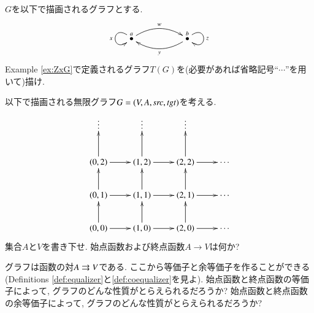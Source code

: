\begin{exercise}\label{exc:secret turing}
$G$を以下で描画されるグラフとする.
$$
\xymatrix{\LMO{a}\ar@/^1pc/[rr]^w\ar@(lu,ld)[]_x&&\LMO{b}\ar@/^1pc/[ll]^y\ar@(ur,dr)[]^z}
$$
Example \ref{ex:ZxG}で定義されるグラフ$T(G)$を(必要があれば省略記号``$\cdots$''を用いて)描け.
\end{exercise}

\begin{exercise}\label{exc:lattice}
以下で描画される無限グラフ$G=(V,A,\operatorname{\mathit{src}},\operatorname{\mathit{tgt}})$を考える.
$$
\xymatrix{
\vdots&\vdots&\vdots\\
(0,2)\ar[r]\ar[u]&(1,2)\ar[r]\ar[u]&(2,2)\ar[r]\ar[u]&\cdots\\
(0,1)\ar[r]\ar[u]&(1,1)\ar[r]\ar[u]&(2,1)\ar[r]\ar[u]&\cdots\\
(0,0)\ar[r]\ar[u]&(1,0)\ar[r]\ar[u]&(2,0)\ar[r]\ar[u]&\cdots}
$$
\sexc 集合$A$と$V$を書き下せ.
\next 始点函数および終点函数$A\to V$は何か?
\endsexc
\end{exercise}

\begin{exercise}\label{exc:(co)equalizer of graph}
グラフは函数の対$A\rightrightarrows V$である. ここから等価子と余等価子を作ることができる(Definitions \ref{def:equalizer}と\ref{def:coequalizer}を見よ).
\sexc 始点函数と終点函数の等価子によって, グラフのどんな性質がとらえられるだろうか?
\next 始点函数と終点函数の余等価子によって, グラフのどんな性質がとらえられるだろうか?
\endsexc
\end{exercise}


